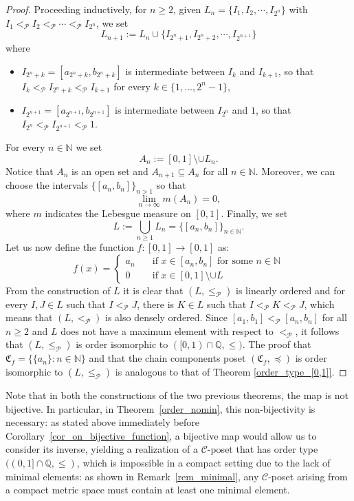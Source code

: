 \documentclass[pdflatex,sn-mathphys-num]{sn-jnl}
\theoremstyle{thmstyleone}%
\theoremstyle{thmstyletwo}%
\theoremstyle{thmstylethree}%
\begin{document}
\begin{proof}
\noindent Proceeding inductively, for $n\ge2$, given $L_n=\{I_1, I_2,\cdots , I_{2^n}\}$ with $I_1<_\mathcal{P} I_2<_\mathcal{P}\cdots <_\mathcal{P} I_{2^n}$, we set
\[
L_{n+1}:=L_n\cup\{I_{2^n+1}, I_{2^n+2},\cdots , I_{2^{n+1}}\}
\]
where
\begin{itemize}
    \item $I_{2^n+k}=[a_{2^n+k}, b_{2^n+k}]$ is intermediate between $I_k$ and $I_{k+1}$, so that $I_k<_\mathcal{P} I_{2^n+k}<_\mathcal{P} I_{k+1}$ for every $k\in\{1,\ldots,2^n-1\}$,
    \item $I_{2^{n+1}}=[a_{2^{n+1}}, b_{2^{n+1}}]$ is intermediate between $I_{2^n}$ and $1$, so that $I_{2^n}<_\mathcal{P} I_{2^{n+1}}<_\mathcal{P} 1$.
\end{itemize}
For every $n\in\mathbb{N}$ we set 
$$
A_n:=[0,1]\setminus \cup L_n.
$$ 
Notice that $A_n$ is an open set and $A_{n+1}\subseteq A_{n}$ for all $n\in\mathbb{N}$. Moreover, we can choose the intervals $\{[a_n,b_n]\}_{n>1}$ so that 
\begin{equation*}
    \lim_{n\to\infty} m(A_n)=0,
\end{equation*}
where $m$ indicates the Lebesgue measure on $[0,1]$.
Finally, we set 
$$
L:=\bigcup_{n\ge 1}L_n=\{[a_n,b_n]\}_{n\in\mathbb{N}}.
$$
Let us now define the function $f:[0,1]\to [0,1]$ as:
\begin{equation*}\label{disc_nomin_f}
    f(x)=
    \begin{cases}
        a_n &\quad \text{if $x\in [a_n,b_n]$ for some $n\in\mathbb{N}$}\\
        0 &\quad   \text{if $x\in [0,1]\setminus \cup L$}
    \end{cases}
\end{equation*}
\noindent From the construction of $L$ it is clear that $(L,\le_\mathcal{P})$ is linearly ordered and for every $I, J\in L$ such that $I<_\mathcal{P} J$, there is $K\in L$ such that
$ I<_\mathcal{P} K<_\mathcal{P} J$, which means that $(L,<_\mathcal{P})$ is also densely ordered.
Since $[a_1,b_1]<_\mathcal{P}[a_n,b_n]$ for all $n\ge2$ and $L$ does not have a maximum element with respect to $<_\mathcal{P}$, it follows that $(L,\le_\mathcal{P})$ is order isomorphic to $([0,1)\cap \mathbb{Q}, \leq)$.
The proof that $\mathfrak{C}_f=\{\{a_n\}:n\in\mathbb{N}\}$ and that the chain components poset $(\mathfrak{C}_f,\preceq)$ is order isomorphic to $(L,\le_\mathcal{P})$ is analogous to that of Theorem \ref{order_type_[0,1]}.
\end{proof}

\noindent Note that in both the constructions of the two previous theorems, the map is not bijective. 
In particular, in Theorem~\ref{order_nomin}, this non-bijectivity is necessary: as stated above immediately before Corollary~\ref{cor_on_bijective_function}, a bijective map would allow us to consider its inverse, yielding a realization of a $\mathcal{C}$-poset that has order type $((0,1] \cap \mathbb{Q},\le )$, which is impossible in a compact setting due to the lack of minimal elements: as shown in Remark~\ref{rem_minimal}, any $\mathcal{C}$-poset arising from a compact metric space must contain at least one minimal element. 
\end{document}
